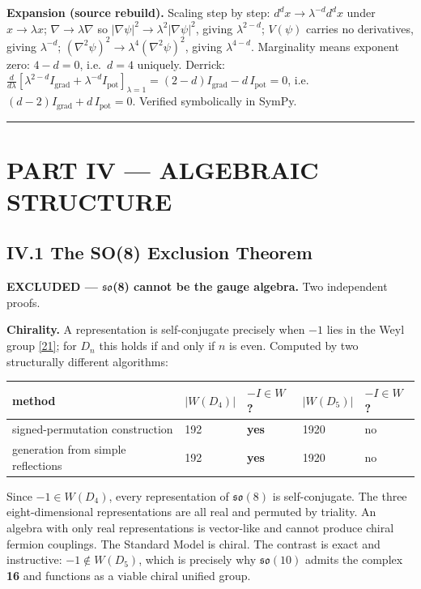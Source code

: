 \documentclass[a4paper,11pt]{article}
\newcommand{\expansion}[1]{\par\smallskip\noindent\textbf{Expansion (source rebuild).} #1\par\smallskip}
\begin{document}
\expansion{Scaling step by step: $d^dx \to \lambda^{-d}d^dx$ under $x \to \lambda x$; $\nabla \to \lambda\nabla$ so $|\nabla\psi|^2 \to \lambda^2|\nabla\psi|^2$, giving $\lambda^{2-d}$; $V(\psi)$ carries no derivatives, giving $\lambda^{-d}$; $(\nabla^2\psi)^2 \to \lambda^4(\nabla^2\psi)^2$, giving $\lambda^{4-d}$. Marginality means exponent zero: $4 - d = 0$, i.e.\ $d = 4$ uniquely. Derrick: $\tfrac{d}{d\lambda}[\lambda^{2-d}I_{\mathrm{grad}} + \lambda^{-d}I_{\mathrm{pot}}]_{\lambda=1} = (2-d)I_{\mathrm{grad}} - d\,I_{\mathrm{pot}} = 0$, i.e.\ $(d-2)I_{\mathrm{grad}} + d\,I_{\mathrm{pot}} = 0$. Verified symbolically in SymPy.}
\medskip\hrule\medskip

\section*{PART IV — ALGEBRAIC STRUCTURE}

\subsection*{IV.1 The SO(8) Exclusion Theorem}

\textbf{EXCLUDED — $\mathfrak{s}$$\mathfrak{o}$(8) cannot be the gauge algebra.} Two independent proofs.

\textbf{Chirality.} A representation is self-conjugate precisely when $-1$ lies in the Weyl group \hyperref[ref21]{[21]}; for $D_n$ this holds if and only if $n$ is even. Computed by two structurally different algorithms:

\begin{center}
\begin{tabular}{lllll}
\hline
method & $|W(D_4)|$ & $-I\in W$? & $|W(D_5)|$ & $-I\in W$? \\
\hline
signed-permutation construction & 192 & \textbf{yes} & 1920 & no \\
generation from simple reflections & 192 & \textbf{yes} & 1920 & no \\
\hline
\end{tabular}
\end{center}

Since $-1\in W(D_4)$, every representation of $\mathfrak{so}(8)$ is self-conjugate. The three eight-dimensional representations are all real and permuted by triality. An algebra with only real representations is vector-like and cannot produce chiral fermion couplings. The Standard Model is chiral. The contrast is exact and instructive: $-1\notin W(D_5)$, which is precisely why $\mathfrak{so}(10)$ admits the complex \textbf{16} and functions as a viable chiral unified group.
\end{document}
